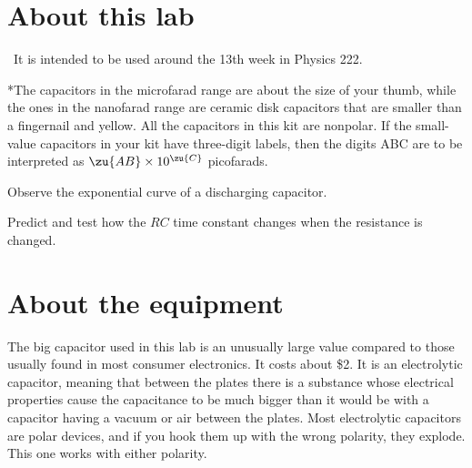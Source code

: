 \renewcommand\thechapter{c2.13a}
\label{lab:rc-circuits}

\section*{About this lab}

\covid\ 
It is intended to be used around the 13th week in Physics 222.

\apparatus
{}

*The capacitors in the microfarad range are about the size of
your thumb, while the ones in the nanofarad range are ceramic disk capacitors that are smaller
than a fingernail and yellow. All the capacitors in this kit are nonpolar.
If the small-value capacitors in your kit have three-digit labels,
then the digits ABC are to be interpreted as $\zu{AB}\times10^\zu{C}$
picofarads.

\begin{goals}

\item[] Observe the exponential curve of a discharging capacitor.

\item[] Predict and test how the $RC$ time constant changes when the resistance is changed.
\end{goals}

\section*{About the equipment}

The big capacitor used in this lab is an unusually large value compared to those usually found
in most consumer electronics. It costs about \$2. It is an electrolytic capacitor, meaning that
between the plates there is a substance whose electrical properties cause the capacitance to
be much bigger than it would be with a capacitor having a vacuum or air between the plates.
Most electrolytic capacitors are polar devices, and if you hook them up with the wrong polarity,
they explode. This one works with either polarity.

